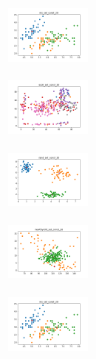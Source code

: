 \vspace*{\fill}
\newpage
\vspace*{\fill}

\begin{figure}[H]    
    \centering
    \begin{subfigure}
        \centering
        \includegraphics[width=0.234\textwidth]{img/aggun/iris_set_const_20_949004259_clust.png}
    \end{subfigure}
    \hfill
    \begin{subfigure}
        \centering
        \includegraphics[width=0.234\textwidth]{img/aggun/ecoli_set_const_20_949004259_clust.png}
    \end{subfigure}
    \hfill
    \begin{subfigure}
        \centering
        \includegraphics[width=0.234\textwidth]{img/aggun/rand_set_const_20_949004259_clust.png}
    \end{subfigure}
    \hfill
    \begin{subfigure}
        \centering
        \includegraphics[width=0.234\textwidth]{img/aggun/newthyroid_set_const_20_949004259_clust.png}
    \end{subfigure}
    \hfill
    \begin{subfigure}
        \centering
        \includegraphics[width=0.234\textwidth]{img/aggun/iris_set_const_20_589741062_clust.png}

\end{subfigure}
\end{figure}
